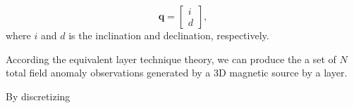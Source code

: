  \begin{equation}
   \mathbf{q} =
   \left[ \begin{array}{c}
   i  \\ 
   d     
   \end{array} \right] ,
   \label{eq:q_vector}
 \end{equation}
 where $i$ and $d$ is the inclination and declination, respectively.



According the equivalent layer technique theory, we can produce the a set of $N$ total field anomaly 
observations generated by a 3D magnetic source by a layer. 


By discretizing 



  











